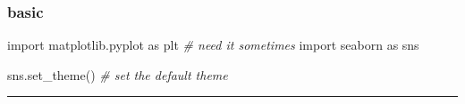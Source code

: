 \documentclass[
]{book}
\newenvironment{Shaded}{\begin{snugshade}}{\end{snugshade}}
\newcommand{\CommentTok}[1]{\textcolor[rgb]{0.56,0.35,0.01}{\textit{#1}}}
\newcommand{\ImportTok}[1]{#1}
\newcommand{\NormalTok}[1]{#1}
\theoremstyle{definition}
\theoremstyle{definition}
\theoremstyle{definition}
\theoremstyle{definition}
\theoremstyle{remark}
\begin{document}
\subsubsection{basic}\label{basic}

\begin{Shaded}
\begin{Highlighting}[]
\ImportTok{import}\NormalTok{ matplotlib.pyplot }\ImportTok{as}\NormalTok{ plt  }\CommentTok{\# need it sometimes}
\ImportTok{import}\NormalTok{ seaborn }\ImportTok{as}\NormalTok{ sns}

\NormalTok{sns.set\_theme() }\CommentTok{\# set the default theme}
\end{Highlighting}
\end{Shaded}

\begin{center}\rule{0.5\linewidth}{0.5pt}\end{center}
\end{document}
